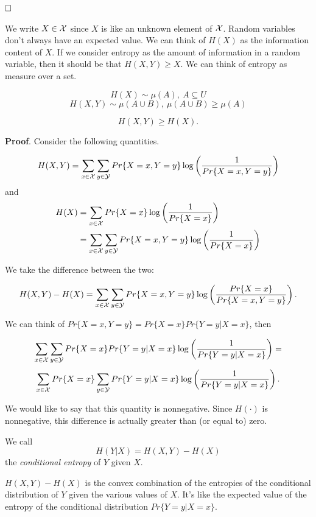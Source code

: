 $\hfill\Box$

We write $X \in \mathcal{X}$ since $X$ is like an unknown element of $\mathcal{X}$. Random variables don't always have an expected value. We can think of $H(X)$ as the information content of $X$. If we consider entropy as the amount of information in a random variable, then it should be that $H(X, Y) \geq X$. We can think of entropy as  measure over a set.

\[
 H(X) \sim \mu(A),\ A \subseteq U
\]
\[
H(X, Y) \sim \mu(A \cup B),\ \mu(A \cup B) \geq \mu(A)
\]

\begin{prop}
  $$H(X, Y) \geq H(X).$$
\end{prop}

\noindent\textbf{Proof}. Consider the following quantities.

\[ 
H(X, Y) = \sum_{x\in \mathcal{X}} \sum_{y \in \mathcal{Y}} Pr\{X=x, Y=y\}\log\left(\dfrac{1}{Pr\{X=x, Y=y\}}\right)
\]
and
\begin{align*}
 H(X) &= \sum_{x\in \mathcal{X}}Pr\{X=x\}\log\left(\dfrac{1}{Pr\{X=x\}}\right)\\
 &=\sum_{x\in\mathcal{X}}\sum_{y\in\mathcal{Y}}Pr\{X=x, Y=y\}\log\left(\dfrac{1}{Pr\{X=x\}}\right) 
\end{align*}

We take the difference between the two:

\[
 H(X, Y) - H(X) =  \sum_{x\in\mathcal{X}}\sum_{y\in\mathcal{Y}}Pr\{X=x, Y=y\}\log\left(\dfrac{Pr\{X=x\}}{Pr\{X=x, Y=y\}}\right).
\]

We can think of $Pr\{X=x, Y=y\} = Pr\{X=x\}Pr\{Y=y | X=x\}$, then

\[
  \sum_{x\in \mathcal{X}} \sum_{y \in \mathcal{Y}} Pr\{X=x\}Pr\{Y=y | X=x\}\log\left(\dfrac{1}{Pr\{Y=y|X=x\}}\right) =
\]
\[
 \sum_{x\in \mathcal{X}}Pr\{X=x\}\sum_{y \in \mathcal{Y}} Pr\{Y=y | X=x\}\log\left(\dfrac{1}{Pr\{Y=y|X=x\}}\right).
\]

We would like to say that this quantity is nonnegative. Since $H(\cdot)$ is nonnegative, this difference is actually greater than (or equal to) zero.

\begin{definition}
We call
\begin{equation}
 H(Y|X) = H(X, Y) - H(X)
\end{equation}
the \emph{conditional entropy} of $Y$ given $X$.

\end{definition}


$H(X, Y) - H(X)$ is the convex combination of the entropies of the conditional distribution of $Y$ given the various values of $X$. It's like the expected value of the entropy of the conditional distribution $Pr\{Y=y | X=x\}$.

